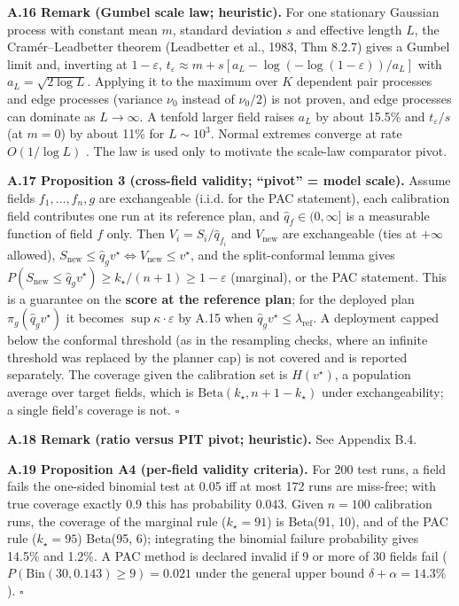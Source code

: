 \documentclass[preprint,12pt,authoryear]{elsarticle}
\begin{document}
\textbf{A.16 Remark (Gumbel scale law; heuristic).} For one stationary Gaussian process with constant mean \(m\), standard deviation \(s\) and effective length \(L\), the Cramér--Leadbetter theorem (Leadbetter et al., 1983, Thm 8.2.7) gives a Gumbel limit and, inverting at \(1-\varepsilon\), \(t_\varepsilon\approx m+s[a_L-\log(-\log(1-\varepsilon))/a_L]\) with \(a_L=\sqrt{2\log L}\). Applying it to the maximum over \(K\) dependent pair processes and edge processes (variance \(\nu_0\) instead of \(\nu_0/2\)) is not proven, and edge processes can dominate as \(L\to\infty\). A tenfold larger field raises \(a_L\) by about 15.5\% and \(t_\varepsilon/s\) (at \(m=0\)) by about 11\% for \(L\sim10^3\). Normal extremes converge at rate \(O(1/\log L)\) \citep{hall1979}. The law is used only to motivate the scale-law comparator pivot.

\textbf{A.17 Proposition 3 (cross-field validity; ``pivot'' = model scale).} Assume fields \(f_1,\dots,f_n,g\) are exchangeable (i.i.d. for the PAC statement), each calibration field contributes one run at its reference plan, and \(\hat q_f\in(0,\infty]\) is a measurable function of field \(f\) only. Then \(V_i=S_i/\hat q_{f_i}\) and \(V_\mathrm{new}\) are exchangeable (ties at \(+\infty\) allowed), \(S_\mathrm{new}\le\hat q_gv^\star\iff V_\mathrm{new}\le v^\star\), and the split-conformal lemma gives \(P(S_\mathrm{new}\le\hat q_gv^\star)\ge k_\star/(n+1)\ge1-\varepsilon\) (marginal), or the PAC statement. This is a guarantee on the \textbf{score at the reference plan}; for the deployed plan \(\pi_g(\hat q_gv^\star)\) it becomes \(\sup\kappa\cdot\varepsilon\) by A.15 when \(\hat q_gv^\star\le\lambda_\mathrm{ref}\). A deployment capped below the conformal threshold (as in the resampling checks, where an infinite threshold was replaced by the planner cap) is not covered and is reported separately. The coverage given the calibration set is \(H(v^\star)\), a population average over target fields, which is \(\mathrm{Beta}(k_\star,n+1-k_\star)\) under exchangeability; a single field's coverage is not. \(\square\)

\textbf{A.18 Remark (ratio versus PIT pivot; heuristic).} See Appendix B.4.

\textbf{A.19 Proposition A4 (per-field validity criteria).} For 200 test runs, a field fails the one-sided binomial test at 0.05 iff at most 172 runs are miss-free; with true coverage exactly 0.9 this has probability 0.043. Given \(n=100\) calibration runs, the coverage of the marginal rule (\(k_\star=91\)) is Beta(91, 10), and of the PAC rule (\(k_\star=95\)) Beta(95, 6); integrating the binomial failure probability gives 14.5\% and 1.2\%. A PAC method is declared invalid if 9 or more of 30 fields fail (\(P(\mathrm{Bin}(30,0.143)\ge9)=0.021\) under the general upper bound \(\delta+\alpha=14.3\%\)). \(\square\)
\end{document}
